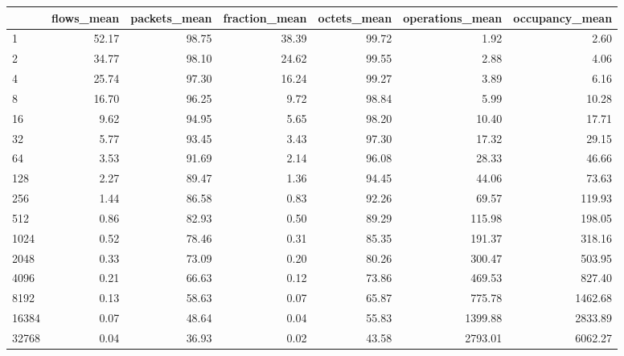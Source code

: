 \begin{tabular}{lrrrrrr}
\toprule
{} &  flows\_mean &  packets\_mean &  fraction\_mean &  octets\_mean &  operations\_mean &  occupancy\_mean \\
\midrule
1        &       52.17 &         98.75 &          38.39 &        99.72 &             1.92 &            2.60 \\
2        &       34.77 &         98.10 &          24.62 &        99.55 &             2.88 &            4.06 \\
4        &       25.74 &         97.30 &          16.24 &        99.27 &             3.89 &            6.16 \\
8        &       16.70 &         96.25 &           9.72 &        98.84 &             5.99 &           10.28 \\
16       &        9.62 &         94.95 &           5.65 &        98.20 &            10.40 &           17.71 \\
32       &        5.77 &         93.45 &           3.43 &        97.30 &            17.32 &           29.15 \\
64       &        3.53 &         91.69 &           2.14 &        96.08 &            28.33 &           46.66 \\
128      &        2.27 &         89.47 &           1.36 &        94.45 &            44.06 &           73.63 \\
256      &        1.44 &         86.58 &           0.83 &        92.26 &            69.57 &          119.93 \\
512      &        0.86 &         82.93 &           0.50 &        89.29 &           115.98 &          198.05 \\
1024     &        0.52 &         78.46 &           0.31 &        85.35 &           191.37 &          318.16 \\
2048     &        0.33 &         73.09 &           0.20 &        80.26 &           300.47 &          503.95 \\
4096     &        0.21 &         66.63 &           0.12 &        73.86 &           469.53 &          827.40 \\
8192     &        0.13 &         58.63 &           0.07 &        65.87 &           775.78 &         1462.68 \\
16384    &        0.07 &         48.64 &           0.04 &        55.83 &          1399.88 &         2833.89 \\
32768    &        0.04 &         36.93 &           0.02 &        43.58 &          2793.01 &         6062.27 \\

\end{tabular}
